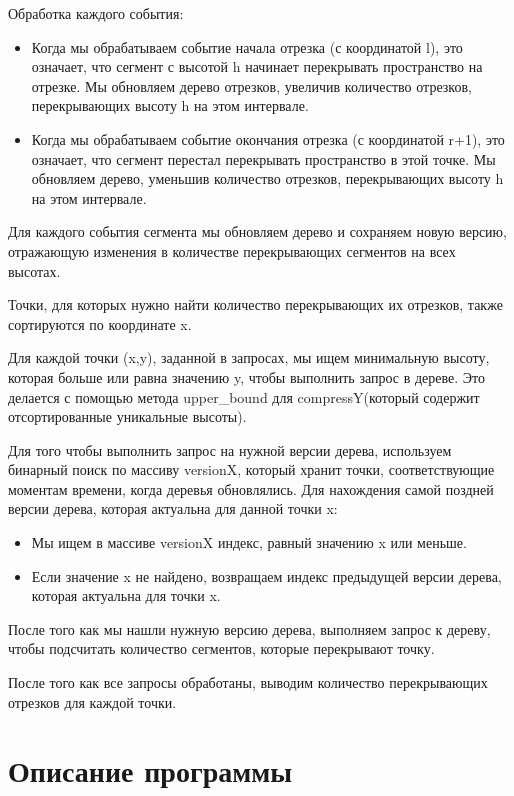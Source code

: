 \documentclass[12pt]{article}
\begin{document}
Обработка каждого события:
\begin{itemize}
    \item Когда мы обрабатываем событие начала отрезка (с координатой l), это означает, что сегмент с высотой h начинает перекрывать пространство на отрезке. Мы обновляем дерево отрезков, увеличив количество отрезков, перекрывающих высоту h на этом интервале.
    \item Когда мы обрабатываем событие окончания отрезка (с координатой r+1), это означает, что сегмент перестал перекрывать пространство в этой точке. Мы обновляем дерево, уменьшив количество отрезков, перекрывающих высоту h на этом интервале.
\end{itemize}

Для каждого события сегмента мы обновляем дерево и сохраняем новую версию, отражающую изменения в количестве перекрывающих сегментов на всех высотах.

Точки, для которых нужно найти количество перекрывающих их отрезков, также сортируются по координате x.

Для каждой точки (x,y), заданной в запросах, мы ищем минимальную высоту, которая больше или равна значению y, чтобы выполнить запрос в дереве. Это делается с помощью метода upper{\_}bound для compressY(который содержит отсортированные уникальные высоты).

Для того чтобы выполнить запрос на нужной версии дерева, используем бинарный поиск по массиву versionX, который хранит точки, соответствующие моментам времени, когда деревья обновлялись. Для нахождения самой поздней версии дерева, которая актуальна для данной точки x:
\begin{itemize}
    \item Мы ищем в массиве versionX индекс, равный значению x или меньше.
    \item Если значение x не найдено, возвращаем индекс предыдущей версии дерева, которая актуальна для точки x.
\end{itemize}

После того как мы нашли нужную версию дерева, выполняем запрос к дереву, чтобы подсчитать количество сегментов, которые перекрывают точку.

После того как все запросы обработаны, выводим количество перекрывающих отрезков для каждой точки.

\newpage
\section*{Описание программы}
\end{document}

